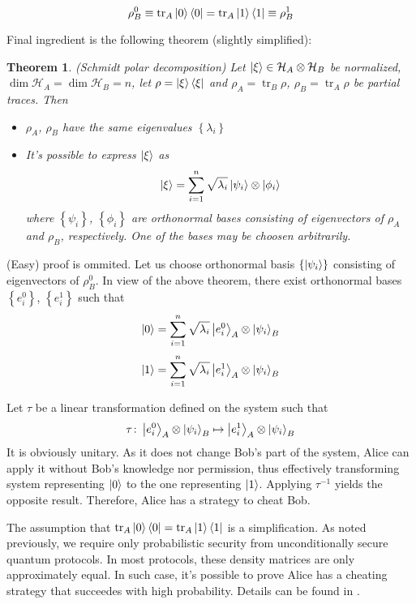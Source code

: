 \documentclass[10pt]{article}
\newtheorem{theorem}{Theorem}
\begin{document}
\[
\rho_B^0\equiv
\operatorname{tr}_A \Ket{0}\Bra{0} = \operatorname{tr}_A \Ket{1}\Bra{1}
\equiv\rho_B^1
\]

Final ingredient is the following theorem (slightly simplified)\cite{Hughston93}: 

\vspace{5mm}

\begin{theorem}(Schmidt polar decomposition) 
Let \(\Ket{\xi}\in\mathcal{H}_A\otimes\mathcal{H}_B\) be normalized, 
\(\dim \mathcal{H}_A=\dim\mathcal{H}_B=n\), let  \(\rho=\Ket{\xi}\Bra{\xi}\)
and \(\rho_A=\operatorname{tr}_B\rho\), \(\rho_B=\operatorname{tr}_A\rho\) be partial traces. Then
\begin{itemize}
  \item \(\rho_A\), \(\rho_B\) have the same eigenvalues \(\left\{\lambda_i\right\}\)
  \item It's possible to express \(\Ket{\xi}\) as 
\[
    \Ket{\xi}=\sum_{i=1}^n\sqrt{\lambda_i}\Ket{\psi_i}\otimes\Ket{\phi_i}
\]
    where \(\left\{\psi_i\right\}\), \(\left\{\phi_i\right\}\) are orthonormal bases consisting of
    eigenvectors of \(\rho_A\) and \(\rho_B\), respectively. One of the bases may be choosen
    arbitrarily.
\end{itemize}
\end{theorem}

\vspace{3mm}

(Easy) proof is ommited. Let us choose orthonormal basis \(\left\{\Ket{\psi_i}\right\}\)
consisting of eigenvectors of \(\rho_B^0\). In view of the above theorem, there exist orthonormal
bases \(\left\{e_i^0\right\}\), \(\left\{e_i^1\right\}\) such that
\[
\Ket{0}=\sum_{i=1}^n\sqrt{\lambda_i}\Ket{e_i^0}_A\otimes\Ket{\psi_i}_B
\]
\[
\Ket{1}=\sum_{i=1}^n\sqrt{\lambda_i}\Ket{e_i^1}_A\otimes\Ket{\psi_i}_B
\]

Let \(\tau\) be a linear transformation defined on the system such that 
\[
\tau\colon\Ket{e_i^0}_A\otimes\Ket{\psi_i}_B \mapsto\Ket{e_i^1}_A\otimes\Ket{\psi_i}_B
\]
It is obviously unitary. As it does not change Bob's part of the system, Alice can apply it 
without Bob's knowledge nor permission, thus effectively transforming system representing \(\Ket{0}\)
to the one representing \(\Ket{1}\). Applying \(\tau^{-1}\) yields the opposite result. Therefore, 
Alice has a strategy to cheat Bob.

The assumption that \(\operatorname{tr}_A \Ket{0}\Bra{0} = \operatorname{tr}_A \Ket{1}\Bra{1}\)
is a simplification. As noted previously, we require only probabilistic security from unconditionally
secure quantum protocols. In most protocols, these density matrices are only approximately equal.
In such case, it's possible to prove Alice has a cheating strategy that succeedes with high 
probability. Details can be found in \cite{Lo96}.
\end{document}
